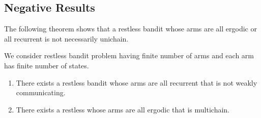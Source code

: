 \subsection{Negative Results}
The following theorem shows that a restless bandit whose arms are all ergodic or all recurrent is not necessarily unichain.

\begin{thm}
    We consider restless bandit problem having finite number of arms and each arm has finite number of states.
    \begin{enumerate}[label=(\roman*)]
        \item \label{thm:not_ergodic} There exists a restless bandit whose arms are all recurrent that is not weakly communicating. %
        \item \label{thm:ergodic_arms_multichain_RB} There exists a restless whose arms are all ergodic that is multichain.
    \end{enumerate}
\end{thm}

